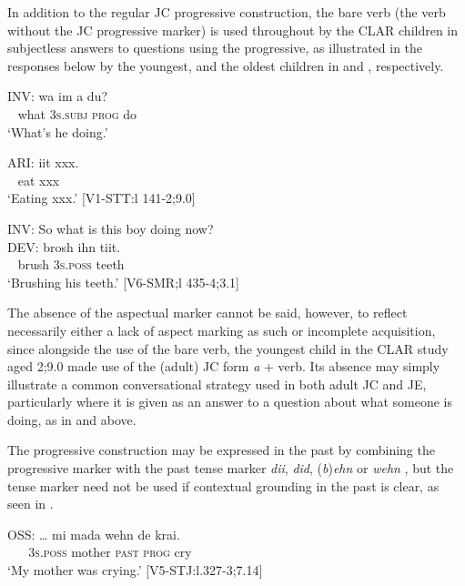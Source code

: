 \documentclass[output=paper,colorlinks,citecolor=brown]{langscibook}
\begin{document}
In addition to the regular JC progressive construction, the bare verb (the verb without the JC progressive marker) is used throughout by the CLAR children in subjectless answers to questions using the progressive, as illustrated in the responses below by the youngest, and the oldest children in  and , respectively.

\ea \label{bkm:messamK:25}
\gll INV:   wa    im          a       du?\\
  ~ what 3\textsc{s.subj} \textsc{prog} do\\
\glt  \hphantom{INV:} `What’s he doing.’

\gll   ARI:   iit  xxx.\\
    ~ eat xxx \\
\glt  \hphantom{ARI:} `Eating xxx.’                   [V1-STT:l 141-2;9.0]
\z



\ea \label{bkm:messamK:26}
INV:  So what is this boy doing now?\\
\gll DEV:   brosh ihn         tiit.\\
    ~ brush 3\textsc{s.poss} teeth\\
\glt \hphantom{INV:} `Brushing his teeth.’                [V6-SMR;l 435-4;3.1]
\z

The absence of the aspectual marker cannot be said, however, to reflect necessarily either a lack of aspect marking as such or incomplete acquisition, since alongside the use of the bare verb, the youngest child in the CLAR study aged 2;9.0 made use of the (adult) JC form \textit{a} + verb. Its absence may simply illustrate a common conversational strategy used in both adult JC and JE, particularly where it is given as an answer to a question about what someone is doing, as in  and  above.

The progressive construction may be expressed in the past by combining the progressive marker with the past tense marker \textit{dii}, \textit{did}, (\textit{b})\textit{ehn} or \textit{wehn} , but the tense marker need not be used if contextual grounding in the past is clear, as seen in .

\ea \label{bkm:messamK:27}
\gll OSS:  …  mi         mada    wehn de     krai.\\
 ~ ~ 3\textsc{s.poss} mother \textsc{past}  \textsc{prog} cry\\
\glt \hphantom{OSS:} `My mother was crying.’              [V5-STJ:l.327-3;7.14]
\z
\end{document}

